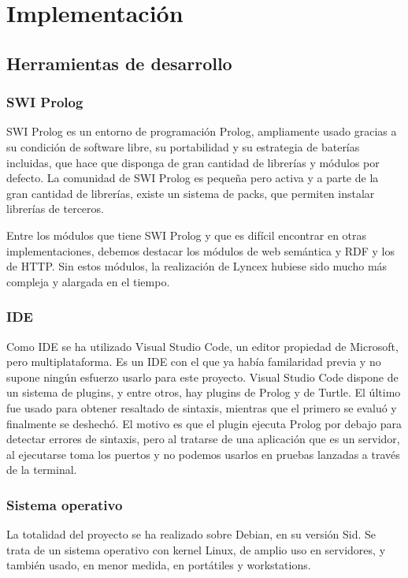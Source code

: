 \documentclass[12pt]{report} %
\begin{document}
\chapter{Implementación}

\section{Herramientas de desarrollo}
\subsection{SWI Prolog}
SWI Prolog\cite{prolog} es un entorno de programación Prolog, ampliamente usado gracias a su condición de software libre, su portabilidad y 
su estrategia de baterías incluidas, que hace que disponga de gran cantidad de librerías y módulos por defecto.
La comunidad de SWI Prolog es pequeña pero activa y a parte de la gran cantidad de librerías, existe un sistema de packs, que permiten instalar librerías de terceros.

Entre los módulos que tiene SWI Prolog y que es difícil encontrar en otras implementaciones, debemos destacar los módulos de web semántica y RDF y los de HTTP.
Sin estos módulos, la realización de Lyncex hubiese sido mucho más compleja y alargada en el tiempo.

\subsection{IDE}
Como IDE se ha utilizado Visual Studio Code\cite{vscode}, un editor propiedad de Microsoft, pero multiplataforma.
Es un IDE con el que ya había familaridad previa y no supone ningún esfuerzo usarlo para este proyecto.
Visual Studio Code dispone de un sistema de plugins, y entre otros, hay plugins de Prolog y de Turtle.
El último fue usado para obtener resaltado de sintaxis, mientras que el primero se evaluó y finalmente se deshechó.
El motivo es que el plugin ejecuta Prolog por debajo para detectar errores de sintaxis, pero al tratarse de una aplicación que es un servidor, al ejecutarse toma los puertos y no podemos usarlos
en pruebas lanzadas a través de la terminal.

\subsection{Sistema operativo}
La totalidad del proyecto se ha realizado sobre Debian, en su versión Sid. Se trata de un sistema operativo con kernel Linux, de amplio uso en servidores, y también usado, en menor medida, en portátiles y workstations.
\end{document}
